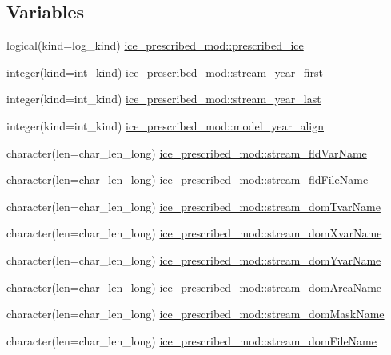 \subsection*{Variables}
\begin{DoxyCompactItemize}
\item 
logical(kind=log\_\-kind) \hyperlink{namespaceice__prescribed__mod_a1b42a8c2b0357eb657332946d2b6c78a}{ice\_\-prescribed\_\-mod::prescribed\_\-ice}
\item 
integer(kind=int\_\-kind) \hyperlink{namespaceice__prescribed__mod_a8ffe8edc2e99d865aa09b7c7f7801c37}{ice\_\-prescribed\_\-mod::stream\_\-year\_\-first}
\item 
integer(kind=int\_\-kind) \hyperlink{namespaceice__prescribed__mod_ade5d68f1b7b652dcacb5263e02aaa099}{ice\_\-prescribed\_\-mod::stream\_\-year\_\-last}
\item 
integer(kind=int\_\-kind) \hyperlink{namespaceice__prescribed__mod_a1710ba150bcf274f07add3f2a05b49e7}{ice\_\-prescribed\_\-mod::model\_\-year\_\-align}
\item 
character(len=char\_\-len\_\-long) \hyperlink{namespaceice__prescribed__mod_a345c4a3ce0fa3d2ebe4468d03a9fe51a}{ice\_\-prescribed\_\-mod::stream\_\-fldVarName}
\item 
character(len=char\_\-len\_\-long) \hyperlink{namespaceice__prescribed__mod_a6f95de7f96b71c33ef261199631ddf80}{ice\_\-prescribed\_\-mod::stream\_\-fldFileName}
\item 
character(len=char\_\-len\_\-long) \hyperlink{namespaceice__prescribed__mod_abae176465bd6efc8cb114772aa63b145}{ice\_\-prescribed\_\-mod::stream\_\-domTvarName}
\item 
character(len=char\_\-len\_\-long) \hyperlink{namespaceice__prescribed__mod_ae6a726ada1e1e93644fa269052a767e4}{ice\_\-prescribed\_\-mod::stream\_\-domXvarName}
\item 
character(len=char\_\-len\_\-long) \hyperlink{namespaceice__prescribed__mod_a38e084e4885a0dcfa51a63fbccbe05b0}{ice\_\-prescribed\_\-mod::stream\_\-domYvarName}
\item 
character(len=char\_\-len\_\-long) \hyperlink{namespaceice__prescribed__mod_a4c5e8c8c8c573e69e00039703e28a83f}{ice\_\-prescribed\_\-mod::stream\_\-domAreaName}
\item 
character(len=char\_\-len\_\-long) \hyperlink{namespaceice__prescribed__mod_afe7ec341a14bd719d0759586a729e76d}{ice\_\-prescribed\_\-mod::stream\_\-domMaskName}
\item 
character(len=char\_\-len\_\-long) \hyperlink{namespaceice__prescribed__mod_a54b8dea8c8a1cdca57b336d8dedeb51c}{ice\_\-prescribed\_\-mod::stream\_\-domFileName}

\end{DoxyCompactItemize}
